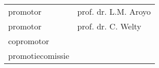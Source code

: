 \thispagestyle{empty}

\begin{addmargin}[-3cm]{1cm}

\begin{flushleft}
\begin{tabular}{l l}
promotor&prof. dr. L.M. Aroyo\\
promotor&prof. dr. C. Welty\\
copromotor&\\
promotiecomissie&\\
\end{tabular}
\end{flushleft}

\end{addmargin}